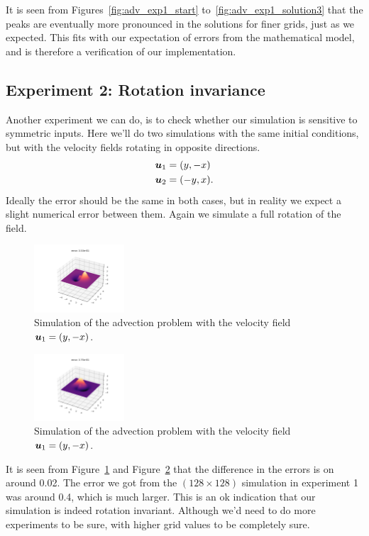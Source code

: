 \documentclass[acmtog]{acmart}
\begin{document}
It is seen from Figures~\ref{fig:adv_exp1_start}
to~\ref{fig:adv_exp1_solution3} that the peaks are eventually more pronounced
in the solutions for finer grids, just as we expected. This fits with our
expectation of errors from the mathematical model, and is therefore a
verification of our implementation.

\subsection{Experiment 2: Rotation invariance}
Another experiment we can do, is to check whether our simulation is sensitive
to symmetric inputs. Here we'll do two simulations with the same initial
conditions, but with the velocity fields rotating in opposite directions.
%
\begin{align}
  \boldsymbol u_1 & = \qty(y, -x)  \\
  \boldsymbol u_2 & = \qty(-y, x).
\end{align}
%
Ideally the error should be the same in both cases, but in reality we expect a
slight numerical error between them. Again we simulate a full rotation of the
field.

\begin{figure}[H]
  \centering
  \includegraphics[width=0.3\textwidth]{Images/advection/exp2_u1.png}
  \caption{Simulation of the advection problem with the velocity field $\boldsymbol u_1 = \qty(y, -x)$.\label{fig:adv_exp2_u1}}
\end{figure}
\begin{figure}[H]
  \centering
  \includegraphics[width=0.3\textwidth]{Images/advection/exp2_u2.png}
  \caption{Simulation of the advection problem with the velocity field $\boldsymbol u_1 = \qty(y, -x)$.\label{fig:adv_exp2_u2}}
\end{figure}

It is seen from Figure~\ref{fig:adv_exp2_u1} and Figure~\ref{fig:adv_exp2_u2}
that the difference in the errors is on around 0.02. The error we got from the
$(128 \times 128)$ simulation in experiment 1 was around 0.4, which is much
larger. This is an ok indication that our simulation is indeed rotation
invariant. Although we'd need to do more experiments to be sure, with higher
grid values to be completely sure.
\end{document}
